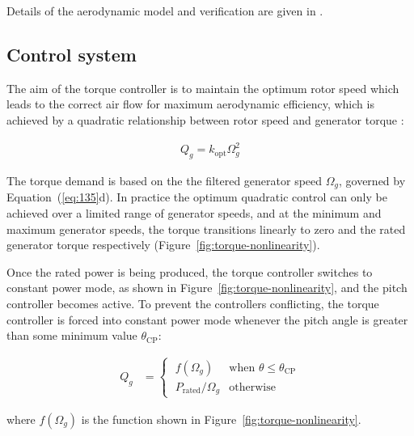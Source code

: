 \documentclass[preprint]{elsarticle}
\newcommand{\mathup}{\mathrm}
\begin{document}
Details of the aerodynamic model and verification are given in
\citet{lupton_frequencydomain_2015}.

\subsection{Control system}
\label{sec:torque-control}

The aim of the torque controller is to maintain the optimum rotor speed which
leads to the correct air flow for maximum aerodynamic efficiency, which is
achieved by a quadratic relationship between rotor speed and generator torque
\citep[chapter~8]{Burton2011}:
\begin{linenomath}\begin{align}
  \label{eq:157}
  Q_g = k_{\mathup{opt}} \Omega_g^2
\end{align}\end{linenomath}
The torque demand is based on the the filtered generator speed $\Omega_g$, governed
by Equation~(\ref{eq:135}d). In practice the optimum quadratic control can only
be achieved over a limited range of generator speeds, and at the minimum and
maximum generator speeds, the torque transitions linearly to zero and the rated
generator torque respectively (Figure~\ref{fig:torque-nonlinearity}).

Once the rated power is being produced, the torque controller switches to
constant power mode, as shown in Figure~\ref{fig:torque-nonlinearity}, and the
pitch controller becomes active. To prevent the controllers conflicting, the
torque controller is forced into constant power mode whenever the pitch angle is
greater than some minimum value $\theta{}_{\mathup{CP}}$:
\begin{linenomath}\begin{align}
  \label{eq:195}
  Q_g &= \begin{cases}
    \; f(\Omega_g) & \text{when $\theta{} \le \theta{}_{\mathup{CP}}$} \\
    \; P_{\mathup{rated}} / \Omega_g & \text{otherwise}
  \end{cases}
\end{align}\end{linenomath}
where $f(\Omega_g)$ is the function shown in Figure~\ref{fig:torque-nonlinearity}.
\end{document}
